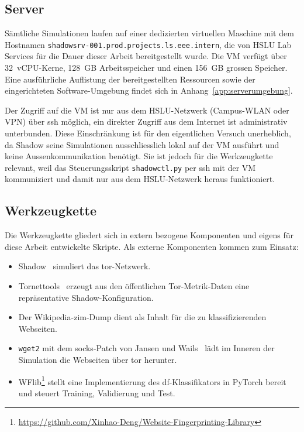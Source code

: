 \subsection{Server}

Sämtliche Simulationen laufen auf einer dedizierten virtuellen Maschine mit dem Hostnamen \texttt{shadowsrv-001.prod.projects.ls.eee.intern}, die von HSLU Lab Services für die Dauer dieser Arbeit bereitgestellt wurde.
Die VM verfügt über 32~vCPU-Kerne, 128~GB Arbeitsspeicher und einen 156~GB grossen Speicher.
Eine ausführliche Auflistung der bereitgestellten Ressourcen sowie der eingerichteten Software-Umgebung findet sich in Anhang~\ref{app:serverumgebung}.

Der Zugriff auf die VM ist nur aus dem HSLU-Netzwerk (Campus-WLAN oder VPN) über \gls{ssh} möglich, ein direkter Zugriff aus dem Internet ist administrativ unterbunden.
Diese Einschränkung ist für den eigentlichen Versuch unerheblich, da Shadow seine Simulationen ausschliesslich lokal auf der VM ausführt und keine Aussenkommunikation benötigt.
Sie ist jedoch für die Werkzeugkette relevant, weil das Steuerungsskript \texttt{shadowctl.py} per \gls{ssh} mit der VM kommuniziert und damit nur aus dem HSLU-Netzwerk heraus funktioniert.

\subsection{Werkzeugkette}

Die Werkzeugkette gliedert sich in extern bezogene Komponenten und eigens für diese Arbeit entwickelte Skripte.
Als externe Komponenten kommen zum Einsatz:

\begin{itemize}
    \item Shadow~\cite{jansen2011shadow,netsim-atc2022} simuliert das \gls{tor}-Netzwerk.
    \item Tornettools~\cite{neverenough-sec2021} erzeugt aus den öffentlichen Tor-Metrik-Daten eine repräsentative Shadow-Konfiguration.
    \item Der Wikipedia-\gls{zim}-Dump dient als Inhalt für die zu klassifizierenden Webseiten.
    \item \texttt{wget2} mit dem \gls{socks}-Patch von Jansen und Wails~\cite{jansen2023data} lädt im Inneren der Simulation die Webseiten über \gls{tor} herunter.
    \item WFlib\footnote{\url{https://github.com/Xinhao-Deng/Website-Fingerprinting-Library}} stellt eine Implementierung des \gls{df}-Klassifikators in PyTorch bereit und steuert Training, Validierung und Test.
\end{itemize}

